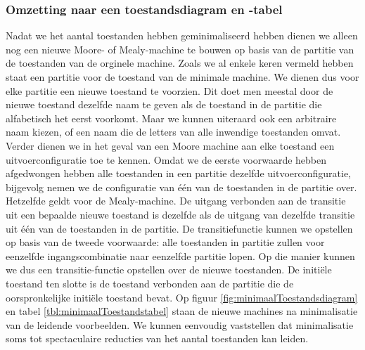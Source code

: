 \subsubsection{Omzetting naar een toestandsdiagram en -tabel}
Nadat we het aantal toestanden hebben geminimaliseerd hebben dienen we alleen nog een nieuwe Moore- of Mealy-machine te bouwen op basis van de partitie van de toestanden van de orginele machine. Zoals we al enkele keren vermeld hebben staat een partitie voor de toestand van de minimale machine. We dienen dus voor elke partitie een nieuwe toestand te voorzien. Dit doet men meestal door de nieuwe toestand dezelfde naam te geven als de toestand in de partitie die alfabetisch het eerst voorkomt. Maar we kunnen uiteraard ook een arbitraire naam kiezen, of een naam die de letters van alle inwendige toestanden omvat. Verder dienen we in het geval van een Moore machine aan elke toestand een uitvoerconfiguratie toe te kennen. Omdat we de eerste voorwaarde hebben afgedwongen hebben alle toestanden in een partitie dezelfde uitvoerconfiguratie, bijgevolg nemen we de configuratie van \'e\'en van de toestanden in de partitie over. Hetzelfde geldt voor de Mealy-machine. De uitgang verbonden aan de transitie uit een bepaalde nieuwe toestand is dezelfde als de uitgang van dezelfde transitie uit \'e\'en van de toestanden in de partitie. De transitiefunctie kunnen we opstellen op basis van de tweede voorwaarde: alle toestanden in partitie zullen voor eenzelfde ingangscombinatie naar eenzelfde partitie lopen. Op die manier kunnen we dus een transitie-functie opstellen over de nieuwe toestanden. De initi\"ele toestand ten slotte is de toestand verbonden aan de partitie die de oorspronkelijke initi\"ele toestand bevat. Op figuur \ref{fig:minimaalToestandsdiagram} en tabel \ref{tbl:minimaalToestandstabel} staan de nieuwe machines na minimalisatie van de leidende voorbeelden. We kunnen eenvoudig vaststellen dat minimalisatie soms tot spectaculaire reducties van het aantal toestanden kan leiden.
